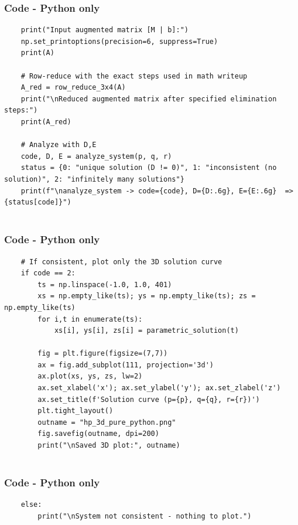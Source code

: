 \documentclass{beamer}
\theoremstyle{remark}
\numberwithin{equation}{section}
\begin{document}
\begin{frame}[fragile]
\frametitle{Code - Python only}
\begin{lstlisting}
    print("Input augmented matrix [M | b]:")
    np.set_printoptions(precision=6, suppress=True)
    print(A)

    # Row-reduce with the exact steps used in math writeup
    A_red = row_reduce_3x4(A)
    print("\nReduced augmented matrix after specified elimination steps:")
    print(A_red)

    # Analyze with D,E
    code, D, E = analyze_system(p, q, r)
    status = {0: "unique solution (D != 0)", 1: "inconsistent (no solution)", 2: "infinitely many solutions"}
    print(f"\nanalyze_system -> code={code}, D={D:.6g}, E={E:.6g}  => {status[code]}")


\end{lstlisting}
\end{frame}

\begin{frame}[fragile]
\frametitle{Code - Python only}
\begin{lstlisting}
    # If consistent, plot only the 3D solution curve
    if code == 2:
        ts = np.linspace(-1.0, 1.0, 401)
        xs = np.empty_like(ts); ys = np.empty_like(ts); zs = np.empty_like(ts)
        for i,t in enumerate(ts):
            xs[i], ys[i], zs[i] = parametric_solution(t)

        fig = plt.figure(figsize=(7,7))
        ax = fig.add_subplot(111, projection='3d')
        ax.plot(xs, ys, zs, lw=2)
        ax.set_xlabel('x'); ax.set_ylabel('y'); ax.set_zlabel('z')
        ax.set_title(f'Solution curve (p={p}, q={q}, r={r})')
        plt.tight_layout()
        outname = "hp_3d_pure_python.png"
        fig.savefig(outname, dpi=200)
        print("\nSaved 3D plot:", outname)


\end{lstlisting}
\end{frame}

\begin{frame}[fragile]
\frametitle{Code - Python only}
\begin{lstlisting}
    else:
        print("\nSystem not consistent - nothing to plot.")



\end{lstlisting}
\end{frame}
\end{document}
